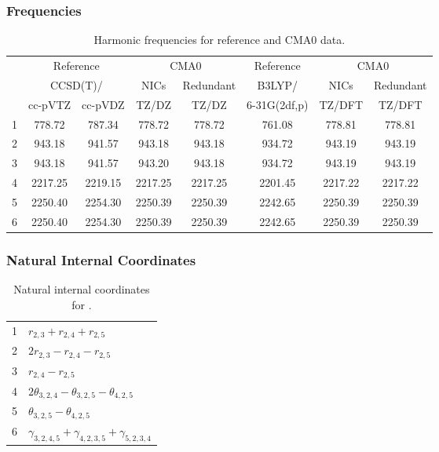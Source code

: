\documentclass[10pt,oneside]{article}
\begin{document}
\begin{table}[h!]
\subsubsection*{Frequencies}
\centering
\caption{Harmonic frequencies for reference and CMA0 data.}
\begin{tabular}{cccccccc}
\toprule
{} & \multicolumn{2}{c}{Reference} & \multicolumn{2}{c}{CMA0} &    Reference & \multicolumn{2}{c}{CMA0} \\
{} & \multicolumn{2}{c}{CCSD(T)/} &    NICs &  Redundant &       B3LYP/ &    NICs & Redundant \\
{} &   cc-pVTZ & cc-pVDZ &   TZ/DZ &      TZ/DZ & 6-31G(2df,p) &  TZ/DFT &    TZ/DFT \\
\midrule
1 &    778.72 &  787.34 &  778.72 &     778.72 &       761.08 &  778.81 &    778.81 \\
2 &    943.18 &  941.57 &  943.18 &     943.18 &       934.72 &  943.19 &    943.19 \\
3 &    943.18 &  941.57 &  943.20 &     943.18 &       934.72 &  943.19 &    943.19 \\
4 &   2217.25 & 2219.15 & 2217.25 &    2217.25 &      2201.45 & 2217.22 &   2217.22 \\
5 &   2250.40 & 2254.30 & 2250.39 &    2250.39 &      2242.65 & 2250.39 &   2250.39 \\
6 &   2250.40 & 2254.30 & 2250.39 &    2250.39 &      2242.65 & 2250.39 &   2250.39 \\
\bottomrule
\end{tabular}
\end{table}

\begin{table}[h!]
\subsubsection*{Natural Internal Coordinates}
\centering
\caption{Natural internal coordinates for .}
\small
\begin{tabular}{ll}
\toprule
  1   & $r_{2,3} + r_{2,4} + r_{2,5}$ \\
  2   & $2r_{2,3} - r_{2,4} - r_{2,5}$ \\
  3   & $r_{2,4} - r_{2,5}$ \\
  4   & $2\theta_{3,2,4} - \theta_{3,2,5} - \theta_{4,2,5}$ \\
  5   & $\theta_{3,2,5} - \theta_{4,2,5}$ \\
  6   & $\gamma_{3,2,4,5} + \gamma_{4,2,3,5} + \gamma_{5,2,3,4}$ \\
\bottomrule
\end{tabular}
\end{table}
\end{document}
